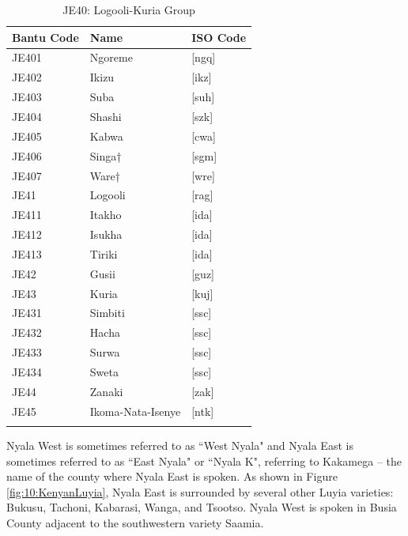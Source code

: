 \documentclass[output=paper]{langscibook}
\begin{document}
\begin{table}
\caption{JE40: Logooli-Kuria Group \citep{maho_nugl_2009}}
\label{tab:2:JE40}
 \begin{tabular}{lll} 
  \lsptoprule
  Bantu Code & Name & ISO Code \\ 
  \midrule
  JE401  & Ngoreme  & [ngq] \\
  JE402  & Ikizu  & [ikz] \\
  JE403  & Suba  & [suh] \\
  JE404  & Shashi  & [szk] \\
  JE405  & Kabwa  & [cwa] \\
  JE406  & Singa†  & [sgm] \\
  JE407  & Ware†  & [wre] \\
  JE41  & Logooli  & [rag] \\
  JE411  & Itakho  & [ida] \\
  JE412  & Isukha  & [ida] \\
  JE413  & Tiriki  & [ida] \\
  JE42  & Gusii  & [guz] \\
  JE43  & Kuria  & [kuj] \\
  JE431  & Simbiti  & [ssc] \\
  JE432  & Hacha  & [ssc] \\
  JE433  & Surwa  & [ssc] \\
  JE434  & Sweta  & [ssc] \\
  JE44  & Zanaki  & [zak] \\
  JE45  & Ikoma-Nata-Isenye  & [ntk] \\
  \lspbottomrule
 \end{tabular}
\end{table}

Nyala West is sometimes referred to as ``West Nyala" and Nyala East is sometimes referred to as ``East Nyala" or ``Nyala K", referring to Kakamega -- the name of the county where Nyala East is spoken. As shown in Figure \ref{fig:10:KenyanLuyia}, Nyala East is surrounded by several other Luyia varieties: Bukusu, Tachoni, Kabarasi, Wanga, and Tsootso. Nyala West is spoken in Busia County adjacent to the southwestern variety Saamia. 
\end{document}
